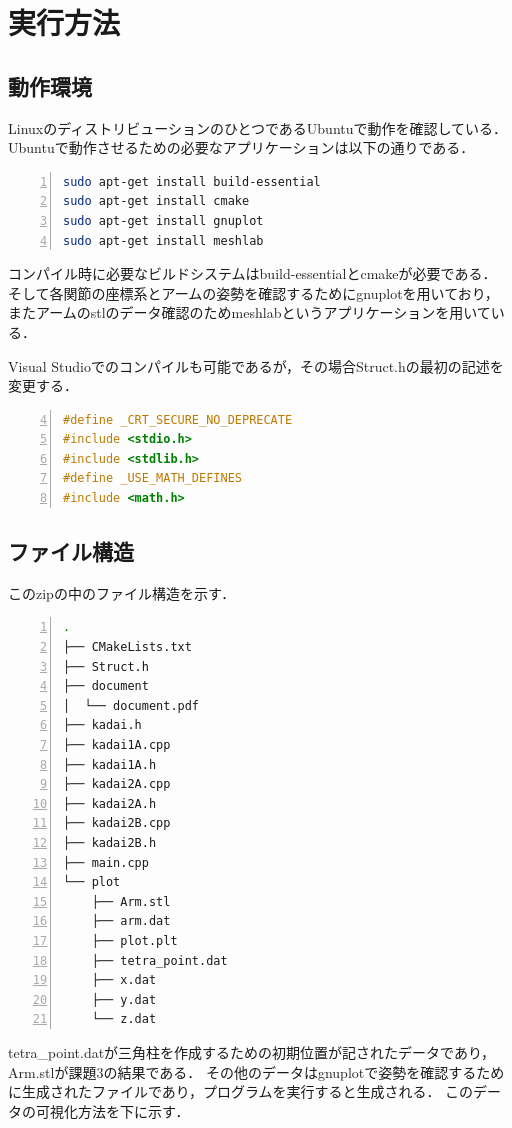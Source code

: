 \documentclass[a4paper,10pt]{jsarticle}
\begin{document}
\section{実行方法}
\subsection{動作環境}
LinuxのディストリビューションのひとつであるUbuntuで動作を確認している．
Ubuntuで動作させるための必要なアプリケーションは以下の通りである．

\begin{lstlisting}[basicstyle=\ttfamily\footnotesize, language=Bash, frame=single, firstnumber=1, numbers=left, breaklines=true]
sudo apt-get install build-essential
sudo apt-get install cmake
sudo apt-get install gnuplot
sudo apt-get install meshlab
\end{lstlisting}

コンパイル時に必要なビルドシステムはbuild-essentialとcmakeが必要である．
そして各関節の座標系とアームの姿勢を確認するためにgnuplotを用いており，またアームのstlのデータ確認のためmeshlabというアプリケーションを用いている．

Visual Studioでのコンパイルも可能であるが，その場合Struct.hの最初の記述を変更する．

\begin{lstlisting}[basicstyle=\ttfamily\footnotesize, language=C, frame=single, firstnumber=4, numbers=left, breaklines=true]
#define _CRT_SECURE_NO_DEPRECATE
#include <stdio.h>
#include <stdlib.h>
#define _USE_MATH_DEFINES
#include <math.h>
\end{lstlisting}

\subsection{ファイル構造}
このzipの中のファイル構造を示す．

\begin{lstlisting}[basicstyle=\ttfamily\footnotesize, language=Bash, frame=single, firstnumber=1, numbers=left, breaklines=true]
.
├── CMakeLists.txt
├── Struct.h
├── document
│  └── document.pdf
├── kadai.h
├── kadai1A.cpp
├── kadai1A.h
├── kadai2A.cpp
├── kadai2A.h
├── kadai2B.cpp
├── kadai2B.h
├── main.cpp
└── plot
    ├── Arm.stl
    ├── arm.dat
    ├── plot.plt
    ├── tetra_point.dat
    ├── x.dat
    ├── y.dat
    └── z.dat
\end{lstlisting}

tetra\_point.datが三角柱を作成するための初期位置が記されたデータであり，Arm.stlが課題3の結果である．
その他のデータはgnuplotで姿勢を確認するために生成されたファイルであり，プログラムを実行すると生成される．
このデータの可視化方法を下に示す．
\end{document}
